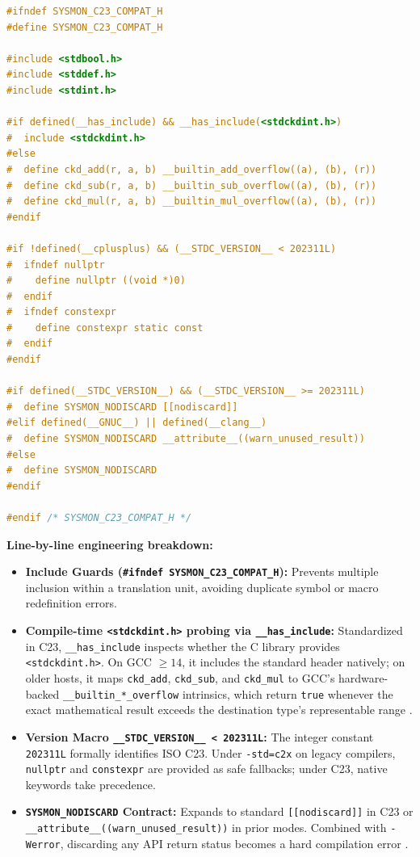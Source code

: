 \documentclass[11pt,a4paper]{article}
\begin{document}
\begin{lstlisting}[language=C,caption={Complete source of \texttt{user/sysmon\_c23/c23\_compat.h}.}]
#ifndef SYSMON_C23_COMPAT_H
#define SYSMON_C23_COMPAT_H

#include <stdbool.h>
#include <stddef.h>
#include <stdint.h>

#if defined(__has_include) && __has_include(<stdckdint.h>)
#  include <stdckdint.h>
#else
#  define ckd_add(r, a, b) __builtin_add_overflow((a), (b), (r))
#  define ckd_sub(r, a, b) __builtin_sub_overflow((a), (b), (r))
#  define ckd_mul(r, a, b) __builtin_mul_overflow((a), (b), (r))
#endif

#if !defined(__cplusplus) && (__STDC_VERSION__ < 202311L)
#  ifndef nullptr
#    define nullptr ((void *)0)
#  endif
#  ifndef constexpr
#    define constexpr static const
#  endif
#endif

#if defined(__STDC_VERSION__) && (__STDC_VERSION__ >= 202311L)
#  define SYSMON_NODISCARD [[nodiscard]]
#elif defined(__GNUC__) || defined(__clang__)
#  define SYSMON_NODISCARD __attribute__((warn_unused_result))
#else
#  define SYSMON_NODISCARD
#endif

#endif /* SYSMON_C23_COMPAT_H */
\end{lstlisting}

\textbf{Line-by-line engineering breakdown:}
\begin{itemize}
\item \textbf{Include Guards (\texttt{\#ifndef SYSMON\_C23\_COMPAT\_H}):} Prevents multiple inclusion within a translation unit, avoiding duplicate symbol or macro redefinition errors.
\item \textbf{Compile-time \texttt{<stdckdint.h>} probing via \texttt{\_\_has\_include}:} Standardized in C23, \texttt{\_\_has\_include} inspects whether the C library provides \texttt{<stdckdint.h>}. On GCC $\ge 14$, it includes the standard header natively; on older hosts, it maps \texttt{ckd\_add}, \texttt{ckd\_sub}, and \texttt{ckd\_mul} to GCC's hardware-backed \texttt{\_\_builtin\_*\_overflow} intrinsics, which return \texttt{true} whenever the exact mathematical result exceeds the destination type's representable range \cite{cppref_numeric}.
\item \textbf{Version Macro \texttt{\_\_STDC\_VERSION\_\_ < 202311L}:} The integer constant \texttt{202311L} formally identifies ISO C23. Under \texttt{-std=c2x} on legacy compilers, \texttt{nullptr} and \texttt{constexpr} are provided as safe fallbacks; under C23, native keywords take precedence.
\item \textbf{\texttt{SYSMON\_NODISCARD} Contract:} Expands to standard \texttt{[[nodiscard]]} in C23 or \texttt{\_\_attribute\_\_((warn\_unused\_result))} in prior modes. Combined with \texttt{-Werror}, discarding any API return status becomes a hard compilation error \cite{gustedt2025}.
\end{itemize}
\end{document}
